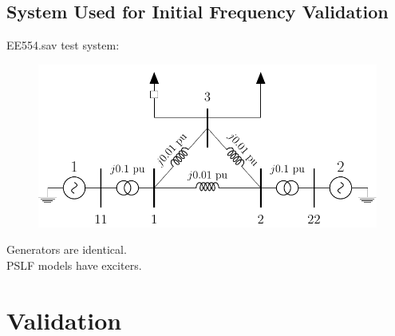 \documentclass[14pt, unknownkeysallowed]{beamer}
\begin{document}
\subsection{System Used for Initial Frequency Validation}
\begin{frame}
EE554.sav test system:
\vspace{-1em}\\
\begin{figure}
	\includegraphics[width=\linewidth]{cicuitEE554}
\end{figure}
\vspace{-1em}
Generators are identical. \\PSLF models have exciters.
\end{frame}

\section{Validation}
\end{document}
